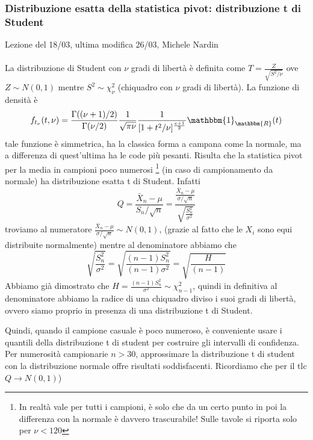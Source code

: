 
\subsubsection{Distribuzione esatta della statistica pivot: distribuzione t di Student}

Lezione del 18/03, ultima modifica 26/03, Michele Nardin
\\
\\
La distribuzione di Student con $\nu$ gradi di libertà è definita come 
$T=\frac{Z}{\sqrt{S^2 / \nu}}$ ove $Z \sim N(0,1)$ mentre $S^2 \sim \chi^2_\nu$ (chiquadro con $\nu$ gradi di libertà).
La funzione di densità è $$f_{t_\nu}(t,\nu)=\frac{\Gamma((\nu + 1)/2)}{\Gamma(\nu / 2)}
\frac{1}{\sqrt{\pi \nu}} \frac{1}{[1+t^2/\nu]^{\frac{v+1}{2}}} \mathbbm{1}_\mathbbm{R} (t)$$
tale funzione è simmetrica, ha la classica forma a campana come la normale, ma a differenza di quest'ultima ha le code più pesanti.
Risulta che la statistica pivot per la media in campioni poco numerosi 
\footnote{In realtà vale per tutti i campioni, è solo che da un certo punto in poi la differenza con la normale è davvero trascurabile! Sulle tavole si riporta solo per $\nu < 120$} (in caso di campionamento da normale) 
ha distribuzione esatta t di Student. Infatti 
$$Q=\frac{\bar{X}_n - \mu}{S_n / \sqrt{n}}=\frac{\frac{\bar{X}_n - \mu}{\sigma / \sqrt{n}}}{\sqrt{\frac{S^2_n}{\sigma^2}}}$$
troviamo al numeratore $\frac{\bar{X}_n - \mu}{\sigma / \sqrt{n}} \sim N(0,1)$, (grazie al fatto che le $X_i$ sono equi distribuite normalmente) 
mentre al denominatore abbiamo che 
$$\sqrt{\frac{S^2_n}{\sigma^2}}= \sqrt{\frac{(n-1)S^2_n}{(n-1) \sigma^2}}= \sqrt{\frac{H}{(n-1)}} $$
Abbiamo già dimostrato che $H=\frac{(n-1)S^2_n}{\sigma^2} \sim \chi^2_{n-1}$, quindi in definitiva al denominatore abbiamo la radice di una chiquadro diviso i suoi gradi di libertà, ovvero siamo proprio in presenza di una distribuzione t di Student.

Quindi, quando il campione casuale è poco numeroso, è conveniente usare i quantili della distribuzione t di student per costruire gli intervalli di confidenza. Per numerosità campionarie $n>30$, approssimare la distribuzione t di student con la distribuzione normale offre risultati soddisfacenti. Ricordiamo che per il tlc $Q\rightarrow N(0,1)$)

